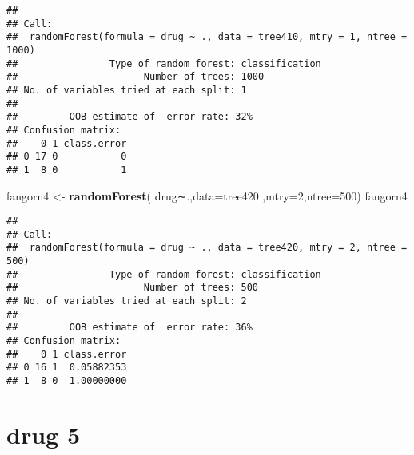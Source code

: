 \documentclass[]{article}
\newenvironment{Shaded}{\begin{snugshade}}{\end{snugshade}}
\newcommand{\KeywordTok}[1]{\textcolor[rgb]{0.13,0.29,0.53}{\textbf{#1}}}
\newcommand{\DataTypeTok}[1]{\textcolor[rgb]{0.13,0.29,0.53}{#1}}
\newcommand{\DecValTok}[1]{\textcolor[rgb]{0.00,0.00,0.81}{#1}}
\newcommand{\StringTok}[1]{\textcolor[rgb]{0.31,0.60,0.02}{#1}}
\newcommand{\CommentTok}[1]{\textcolor[rgb]{0.56,0.35,0.01}{\textit{#1}}}
\newcommand{\OperatorTok}[1]{\textcolor[rgb]{0.81,0.36,0.00}{\textbf{#1}}}
\newcommand{\NormalTok}[1]{#1}
\begin{document}
\begin{verbatim}
## 
## Call:
##  randomForest(formula = drug ~ ., data = tree410, mtry = 1, ntree = 1000) 
##                Type of random forest: classification
##                      Number of trees: 1000
## No. of variables tried at each split: 1
## 
##         OOB estimate of  error rate: 32%
## Confusion matrix:
##    0 1 class.error
## 0 17 0           0
## 1  8 0           1
\end{verbatim}

\begin{Shaded}
\begin{Highlighting}[]
\NormalTok{fangorn4 <-}\StringTok{ }\KeywordTok{randomForest}\NormalTok{( drug∼.,}\DataTypeTok{data=}\NormalTok{tree420  ,}\DataTypeTok{mtry=}\DecValTok{2}\NormalTok{,}\DataTypeTok{ntree=}\DecValTok{500}\NormalTok{)}
\NormalTok{fangorn4}
\end{Highlighting}
\end{Shaded}

\begin{verbatim}
## 
## Call:
##  randomForest(formula = drug ~ ., data = tree420, mtry = 2, ntree = 500) 
##                Type of random forest: classification
##                      Number of trees: 500
## No. of variables tried at each split: 2
## 
##         OOB estimate of  error rate: 36%
## Confusion matrix:
##    0 1 class.error
## 0 16 1  0.05882353
## 1  8 0  1.00000000
\end{verbatim}

\section{drug 5}\label{drug-5}

\begin{Shaded}
\end{Shaded}
\end{document}
